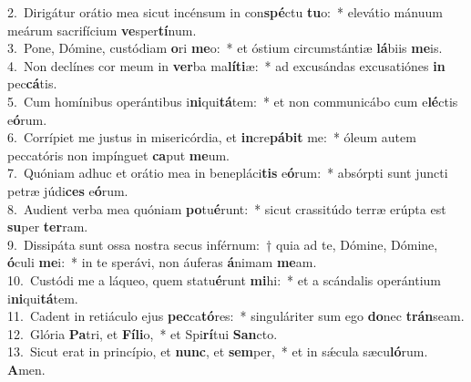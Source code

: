 {2.~}Dirigátur orátio mea sicut incénsum in con\textbf{spé}ctu \textbf{tu}o:~* elevátio mánuum meárum sacrifícium \textbf{ve}sper\textbf{tí}num.\\
{3.~}Pone, Dómine, custódiam \textbf{o}ri \textbf{me}o:~* et óstium circumstántiæ \textbf{lá}biis \textbf{me}is.\\
{4.~}Non declínes cor meum in \textbf{ver}ba ma\textbf{lí}\textbf{ti}æ:~* ad excusándas excusatiónes \textbf{in} pec\textbf{cá}tis.\\
{5.~}Cum homínibus operántibus i\textbf{ni}qui\textbf{tá}tem:~* et non communicábo cum e\textbf{lé}ctis e\textbf{ó}rum.\\
{6.~}Corrípiet me justus in misericórdia, et \textbf{in}cre\textbf{pá}\textbf{bit} me:~* óleum autem peccatóris non impínguet \textbf{ca}put \textbf{me}um.\\
{7.~}Quóniam adhuc et orátio mea in benepláci\textbf{tis} e\textbf{ó}rum:~* absórpti sunt juncti petræ júdi\textbf{ces} e\textbf{ó}rum.\\
{8.~}Audient verba mea quóniam \textbf{po}tu\textbf{é}runt:~* sicut crassitúdo terræ erúpta est \textbf{su}per \textbf{ter}ram.\\
{9.~}Dissipáta sunt ossa nostra secus inférnum:~† quia ad te, Dómine, Dómine, \textbf{ó}culi \textbf{me}i:~* in te sperávi, non áuferas \textbf{á}nimam \textbf{me}am.\\
{10.~}Custódi me a láqueo, quem statu\textbf{é}runt \textbf{mi}hi:~* et a scándalis operántium i\textbf{ni}qui\textbf{tá}tem.\\
{11.~}Cadent in retiáculo ejus \textbf{pec}ca\textbf{tó}res:~* singuláriter sum ego \textbf{do}nec \textbf{trán}seam.\\
{12.~}Glória \textbf{Pa}tri, et \textbf{Fí}\textbf{li}o,~* et Spi\textbf{rí}tui \textbf{San}cto.\\
{13.~}Sicut erat in princípio, et \textbf{nunc}, et \textbf{sem}per,~* et in sǽcula sæcu\textbf{ló}rum. \textbf{A}men.\\
